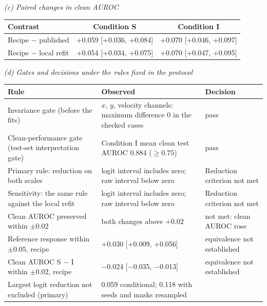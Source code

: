 \medskip
\textit{(c) Paired changes in clean AUROC}\\[2pt]
\begin{tabular}{@{}lcc@{}}
\toprule
Contrast & Condition S & Condition I \\
\midrule
Recipe $-$ published & +0.059 [+0.036, +0.084] & +0.070 [+0.046, +0.097] \\
Recipe $-$ local refit & +0.054 [+0.034, +0.075] & +0.070 [+0.047, +0.095] \\
\bottomrule
\end{tabular}

\medskip
\textit{(d) Gates and decisions under the rules fixed in the protocol}\\[2pt]
\begin{tabularx}{\linewidth}{@{}L{1.05}L{1.2}L{0.75}@{}}
\toprule
Rule & Observed & Decision \\
\midrule
Invariance gate (before the fits) & $x$, $y$, velocity channels: maximum difference 0 in the checked cases & pass \\
Clean-performance gate (test-set interpretation gate) & Condition I mean clean test AUROC 0.884 ($\geq 0.75$) & pass \\
Primary rule: reduction on both scales & logit interval includes zero; raw interval below zero & Reduction criterion not met \\
Sensitivity: the same rule against the local refit & logit interval includes zero; raw interval below zero & Reduction criterion not met \\
Clean AUROC preserved within $\pm 0.02$ & both changes above $+0.02$ & not met: clean AUROC rose \\
Reference response within $\pm 0.05$, recipe & +0.030 [+0.009, +0.056] & equivalence not established \\
Clean AUROC S $-$ I within $\pm 0.02$, recipe & $-$0.024 [$-$0.035, $-$0.013] & equivalence not established \\
Largest logit reduction not excluded (primary) & 0.059 conditional; 0.118 with seeds and masks resampled & \\
\bottomrule
\end{tabularx}

